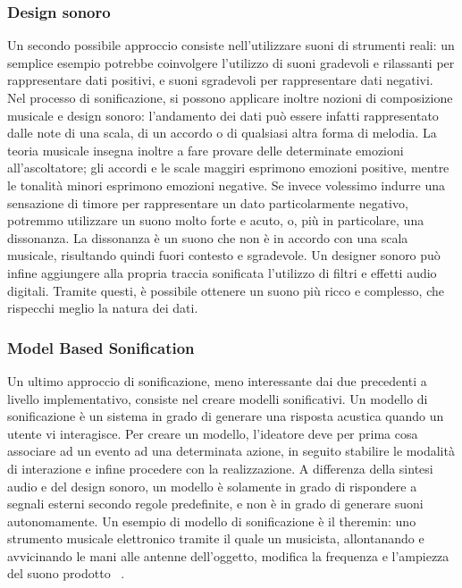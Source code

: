 \subsubsection{Design sonoro}
Un secondo possibile approccio consiste nell'utilizzare suoni di strumenti reali: un semplice esempio potrebbe coinvolgere l'utilizzo di suoni gradevoli e rilassanti per rappresentare dati positivi, e suoni sgradevoli per rappresentare dati negativi.
\\ Nel processo di sonificazione, si possono applicare inoltre nozioni di composizione musicale e design sonoro: l'andamento dei dati può essere infatti rappresentato dalle note di una scala, di un accordo o di qualsiasi altra forma di melodia.
La teoria musicale insegna inoltre a fare provare delle determinate emozioni all'ascoltatore; gli accordi e le scale maggiri esprimono emozioni positive, mentre le tonalità minori esprimono emozioni negative.
Se invece volessimo indurre una sensazione di timore per rappresentare un dato particolarmente negativo, potremmo utilizzare un suono molto forte e acuto, o, più in particolare, una dissonanza.
La dissonanza è un suono che non è in accordo con una scala musicale, risultando quindi fuori contesto e sgradevole.
Un designer sonoro può infine aggiungere alla propria traccia sonificata l'utilizzo di filtri e effetti audio digitali.
Tramite questi, è possibile ottenere un suono più ricco e complesso, che rispecchi meglio la natura dei dati.

\subsubsection{Model Based Sonification}
Un ultimo approccio di sonificazione, meno interessante dai due precedenti a livello implementativo, consiste nel creare modelli sonificativi.
Un modello di sonificazione è un sistema in grado di generare una risposta acustica quando un utente vi interagisce.
Per creare un modello, l'ideatore deve per prima cosa associare ad un evento ad una determinata azione, in seguito stabilire le modalità di interazione e infine procedere con la realizzazione.
A differenza della sintesi audio e del design sonoro, un modello è solamente in grado di rispondere a segnali esterni secondo regole predefinite, e non è in grado di generare suoni autonomamente.
Un esempio di modello di sonificazione è il theremin: uno strumento musicale elettronico tramite il quale un musicista, allontanando e avvicinando le mani alle antenne dell'oggetto, modifica la frequenza e l'ampiezza del suono prodotto ~\cite{sonification_model}.


